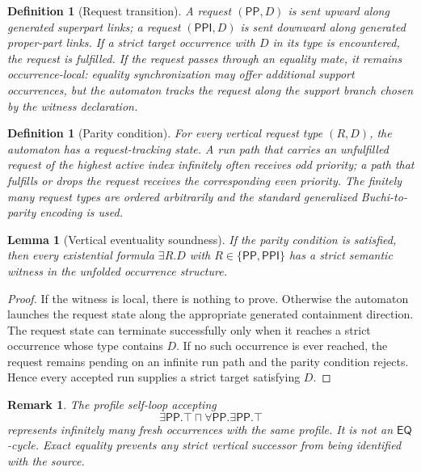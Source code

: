 \documentclass[11pt]{article}
\newtheorem{lemma}[theorem]{Lemma}
\newtheorem{definition}[theorem]{Definition}
\newtheorem{remark}[theorem]{Remark}
\newcommand{\EQ}{\mathsf{EQ}}
\newcommand{\PP}{\mathsf{PP}}
\newcommand{\PPI}{\mathsf{PPI}}
\begin{document}
\begin{definition}[Request transition]
A request $(\PP,D)$ is sent upward along generated superpart links; a request $(\PPI,D)$ is sent downward along generated proper-part links.  If a strict target occurrence with $D$ in its type is encountered, the request is fulfilled.  If the request passes through an equality mate, it remains occurrence-local: equality synchronization may offer additional support occurrences, but the automaton tracks the request along the support branch chosen by the witness declaration.
\end{definition}

\begin{definition}[Parity condition]
For every vertical request type $(R,D)$, the automaton has a request-tracking state.  A run path that carries an unfulfilled request of the highest active index infinitely often receives odd priority; a path that fulfills or drops the request receives the corresponding even priority.  The finitely many request types are ordered arbitrarily and the standard generalized Buchi-to-parity encoding is used.
\end{definition}

\begin{lemma}[Vertical eventuality soundness]
If the parity condition is satisfied, then every existential formula $\exists R.D$ with $R\in\{\PP,\PPI\}$ has a strict semantic witness in the unfolded occurrence structure.
\end{lemma}

\begin{proof}
If the witness is local, there is nothing to prove.  Otherwise the automaton launches the request state along the appropriate generated containment direction.  The request state can terminate successfully only when it reaches a strict occurrence whose type contains $D$.  If no such occurrence is ever reached, the request remains pending on an infinite run path and the parity condition rejects.  Hence every accepted run supplies a strict target satisfying $D$.
\end{proof}

\begin{remark}
The profile self-loop accepting
\[
  \exists\PP.\top\sqcap\forall\PP.\exists\PP.\top
\]
represents infinitely many fresh occurrences with the same profile.  It is not an $\EQ$-cycle.  Exact equality prevents any strict vertical successor from being identified with the source.
\end{remark}
\end{document}
